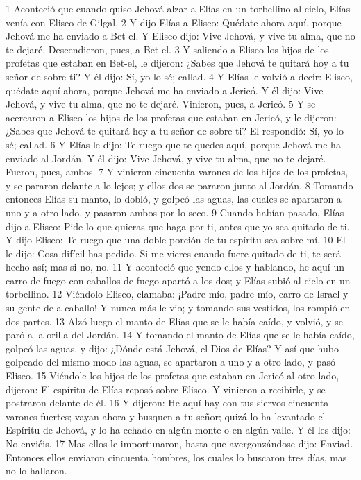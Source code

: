 1 Aconteció que cuando quiso Jehová alzar a Elías en un torbellino al cielo, Elías venía con Eliseo de Gilgal.
2 Y dijo Elías a Eliseo: Quédate ahora aquí, porque Jehová me ha enviado a Bet-el. Y Eliseo dijo: Vive Jehová, y vive tu alma, que no te dejaré. Descendieron, pues, a Bet-el.
3 Y saliendo a Eliseo los hijos de los profetas que estaban en Bet-el, le dijeron: ¿Sabes que Jehová te quitará hoy a tu señor de sobre ti? Y él dijo: Sí, yo lo sé; callad.
4 Y Elías le volvió a decir: Eliseo, quédate aquí ahora, porque Jehová me ha enviado a Jericó. Y él dijo: Vive Jehová, y vive tu alma, que no te dejaré. Vinieron, pues, a Jericó.
5 Y se acercaron a Eliseo los hijos de los profetas que estaban en Jericó, y le dijeron: ¿Sabes que Jehová te quitará hoy a tu señor de sobre ti? El respondió: Sí, yo lo sé; callad.
6 Y Elías le dijo: Te ruego que te quedes aquí, porque Jehová me ha enviado al Jordán. Y él dijo: Vive Jehová, y vive tu alma, que no te dejaré. Fueron, pues, ambos.
7 Y vinieron cincuenta varones de los hijos de los profetas, y se pararon delante a lo lejos; y ellos dos se pararon junto al Jordán.
8 Tomando entonces Elías su manto, lo dobló, y golpeó las aguas, las cuales se apartaron a uno y a otro lado, y pasaron ambos por lo seco.
9 Cuando habían pasado, Elías dijo a Eliseo: Pide lo que quieras que haga por ti, antes que yo sea quitado de ti. Y dijo Eliseo: Te ruego que una doble porción de tu espíritu sea sobre mí.
10 El le dijo: Cosa difícil has pedido. Si me vieres cuando fuere quitado de ti, te será hecho así; mas si no, no.
11 Y aconteció que yendo ellos y hablando, he aquí un carro de fuego con caballos de fuego apartó a los dos; y Elías subió al cielo en un torbellino.
12 Viéndolo Eliseo, clamaba: ¡Padre mío, padre mío, carro de Israel y su gente de a caballo! Y nunca más le vio; y tomando sus vestidos, los rompió en dos partes.
13 Alzó luego el manto de Elías que se le había caído, y volvió, y se paró a la orilla del Jordán.
14 Y tomando el manto de Elías que se le había caído, golpeó las aguas, y dijo: ¿Dónde está Jehová, el Dios de Elías? Y así que hubo golpeado del mismo modo las aguas, se apartaron a uno y a otro lado, y pasó Eliseo.
15 Viéndole los hijos de los profetas que estaban en Jericó al otro lado, dijeron: El espíritu de Elías reposó sobre Eliseo. Y vinieron a recibirle, y se postraron delante de él.
16 Y dijeron: He aquí hay con tus siervos cincuenta varones fuertes; vayan ahora y busquen a tu señor; quizá lo ha levantado el Espíritu de Jehová, y lo ha echado en algún monte o en algún valle. Y él les dijo: No enviéis.
17 Mas ellos le importunaron, hasta que avergonzándose dijo: Enviad. Entonces ellos enviaron cincuenta hombres, los cuales lo buscaron tres días, mas no lo hallaron.
